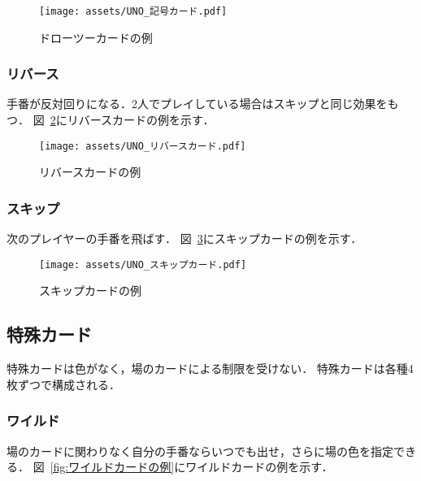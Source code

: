 \documentclass[11pt]{ltjsarticle}
\newcommand{\figref}[1]{図~\ref{#1}}
\begin{document}
\begin{figure}[h]
  \begin{center}
    \texttt{[image: assets/UNO\_記号カード.pdf]}
    \caption{ドローツーカードの例}
    \label{fig:ドローツーカードの例}
  \end{center}
\end{figure}

\subsubsection{リバース}
手番が反対回りになる．2人でプレイしている場合はスキップと同じ効果をもつ\cite{日本ウノ協会公認ルール}．
\figref{fig:リバースカードの例}にリバースカードの例を示す．

\begin{figure}[h]
  \begin{center}
    \texttt{[image: assets/UNO\_リバースカード.pdf]}
    \caption{リバースカードの例}
    \label{fig:リバースカードの例}
  \end{center}
\end{figure}

\subsubsection{スキップ}
次のプレイヤーの手番を飛ばす\cite{日本ウノ協会公認ルール}．
\figref{fig:スキップカードの例}にスキップカードの例を示す．


\begin{figure}[h]
  \begin{center}
    \texttt{[image: assets/UNO\_スキップカード.pdf]}
    \caption{スキップカードの例}
    \label{fig:スキップカードの例}
  \end{center}
\end{figure}

\newpage

\subsection{特殊カード}
\label{sec:特殊カード}
特殊カードは色がなく，場のカードによる制限を受けない．
特殊カードは各種4枚ずつで構成される．

\subsubsection{ワイルド}
場のカードに関わりなく自分の手番ならいつでも出せ，さらに場の色を指定できる\cite{日本ウノ協会公認ルール}．
\figref{fig:ワイルドカードの例}にワイルドカードの例を示す．
\end{document}
